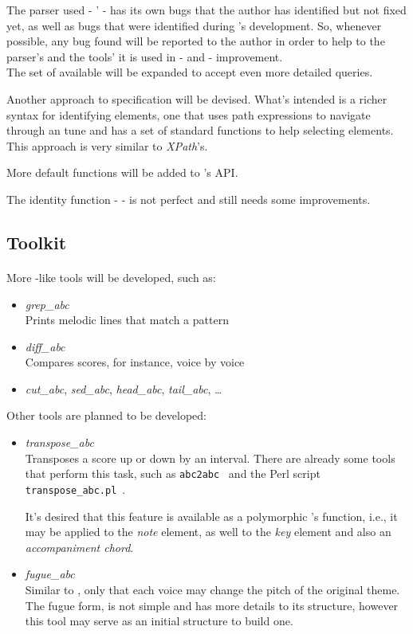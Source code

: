 The parser used - \abcmtops{}' - has its own bugs that the author has identified but not fixed yet,
as well as bugs that were identified during \abcdt{}'s development. So, whenever possible, any bug
found will be reported to the author in order to help to the parser's and the tools' it is used in -
\abcmtops{} and \tclabc{} - improvement.\\


The set of available \actuators{} will be expanded to accept even more detailed queries.

Another approach to \actuator{} specification will be devised. What's intended is a richer syntax
for identifying \abc{} elements, one that uses path expressions to navigate through an \abc{} tune
and has a set of standard functions to help selecting \abc{} elements. This approach is very similar
to \emph{XPath}'s\cite{XPath:Online}.

More default functions will be added to \abcdt{}'s API.

The identity function - \toabc{} - is not perfect and still needs some improvements.

\subsection*{Toolkit}
\paragraph{}
More \unix{}-like tools will be developed, such as:
\begin{itemize}
  \item \emph{grep\_abc}\\
    Prints melodic lines that match a pattern
  \item \emph{diff\_abc}\\
    Compares scores, for instance, voice by voice
  \item \emph{cut\_abc}, \emph{sed\_abc}, \emph{head\_abc}, \emph{tail\_abc}, \ldots
\end{itemize}

Other tools are planned to be developed:
\begin{itemize}
  \item \emph{transpose\_abc}\\
    Transposes a score up or down by an interval. There are already some tools that perform this
    task, such as \texttt{abc2abc}~\cite{abc2abc:Online} and the Perl script
    \texttt{transpose\_abc.pl}~\cite{transposeabc:Online}.

    It's desired that this feature is available as a polymorphic \abcdt{}'s function, i.e., it may
    be applied to the \emph{note} element, as well to the \emph{key} element and also an
    \emph{accompaniment chord}.
  \item \emph{fugue\_abc}\\
    Similar to \canonabc{}, only that each voice may change the pitch of the original theme. The
    fugue form, is not simple and has more details to its structure, however this tool may serve as
    an initial structure to build one.
\end{itemize}

